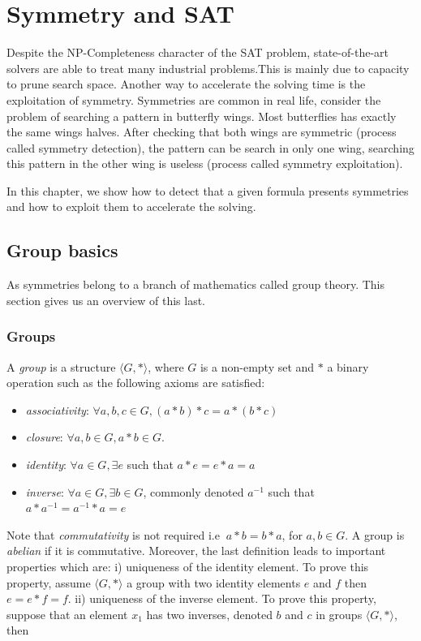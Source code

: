 \chapter{Symmetry and SAT}\label{chap:symmetryinsat}
\minitoc

Despite the NP-Completeness character of the SAT problem, state-of-the-art solvers are able to treat many industrial problems.This is mainly due to capacity to prune search space.
Another way to accelerate the solving time is the exploitation of symmetry.
Symmetries are common in real life, consider the problem of searching a pattern in butterfly wings.
Most butterflies has exactly the same wings halves. After checking that both wings are symmetric
(process called symmetry detection), the pattern can be search in only one wing, searching this pattern in the other wing is useless (process called symmetry exploitation). 

In this chapter, we show how to detect that a given formula presents symmetries and how to
exploit them to accelerate the solving.





\section{Group basics}	
As symmetries belong to a branch of mathematics called group theory.
This section gives us an overview of this last.

\subsection{Groups}
A \emph{group} is a structure $\langle G, * \rangle$, where $G$ is a non-empty set and $*$ a binary
operation such as the following axioms are satisfied:
\begin{itemize}[noitemsep,nolistsep]
 \item \emph{associativity}: $\forall a, b, c \in G, (a * b) * c = a * (b * c)$
 \item \emph{closure}: $\forall a, b \in G, a * b \in G$.
 \item \emph{identity}: $\forall a \in G, \exists e$ such that $ a * e = e * a = a$
 \item \emph{inverse}:  $\forall a \in G, \exists b \in G$, commonly denoted $a^{-1}$ such that
 $a * a^{-1} = a^{-1} * a = e$
\end{itemize}
Note that \emph{commutativity} is not required i.e $\ a * b = b * a$, for $a, b \in G$.
A group is \emph{abelian} if it is commutative.
Moreover, the last definition leads to important properties which are: i) uniqueness of the identity element. 
To prove this property, assume $\langle G, * \rangle$ a group with two identity elements $e$ and $f$ 
then $ e = e * f = f$.
ii) uniqueness of the inverse element. To prove this property, suppose that an element $x_1$ has two inverses,
denoted $b$ and $c$ in groups $\langle G, * \rangle$, then\\

